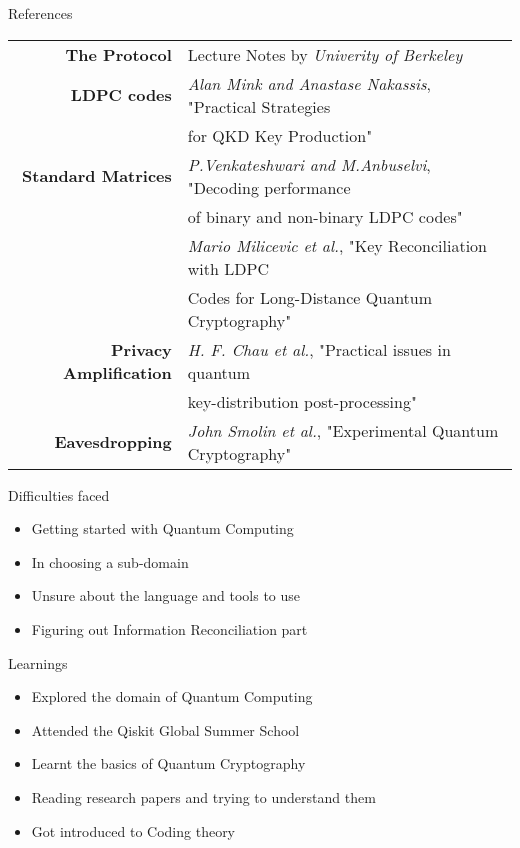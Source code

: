 \documentclass{beamer}
\begin{document}
\begin{frame}{References}
    \begin{tabular}{r l}
        \footnotesize{\textbf{The Protocol}} & \footnotesize{Lecture Notes by \emph{Univerity of Berkeley}} \\
            \footnotesize{\textbf{LDPC codes}} & \footnotesize{\emph{Alan Mink and Anastase Nakassis}}, \footnotesize{"Practical Strategies} \\
             & \footnotesize{for QKD Key Production"} \\
            \footnotesize{\textbf{Standard Matrices}} & \footnotesize{\emph{P.Venkateshwari and M.Anbuselvi}, "Decoding performance} \\ 
             & \footnotesize{of binary and non-binary LDPC codes"} \\
             & \footnotesize{\emph{Mario Milicevic et al.}, "Key Reconciliation with LDPC} \\ 
              & \footnotesize{Codes for Long-Distance Quantum Cryptography"} \\
            \footnotesize{\textbf{Privacy Amplification}} & \footnotesize{\emph{H. F. Chau et al.}, "Practical issues in quantum} \\ 
              & \footnotesize{key-distribution post-processing"} \\
            \footnotesize{\textbf{Eavesdropping}} & \footnotesize{\emph{John Smolin et al.}, "Experimental Quantum Cryptography"} \\
    \end{tabular}
\end{frame}
    

\begin{frame}{Difficulties faced}
	\begin{itemize}
		\item Getting started with Quantum Computing
        \item In choosing a sub-domain
        \item Unsure about the language and tools to use
		\item Figuring out Information Reconciliation part
	\end{itemize}
\end{frame}


\begin{frame}{Learnings}
	\begin{itemize}
		\item Explored the domain of Quantum Computing
        \item Attended the Qiskit Global Summer School
		\item Learnt the basics of Quantum Cryptography
		\item Reading research papers and trying to understand them
		\item Got introduced to Coding theory
	\end{itemize}
\end{frame}
\end{document}
